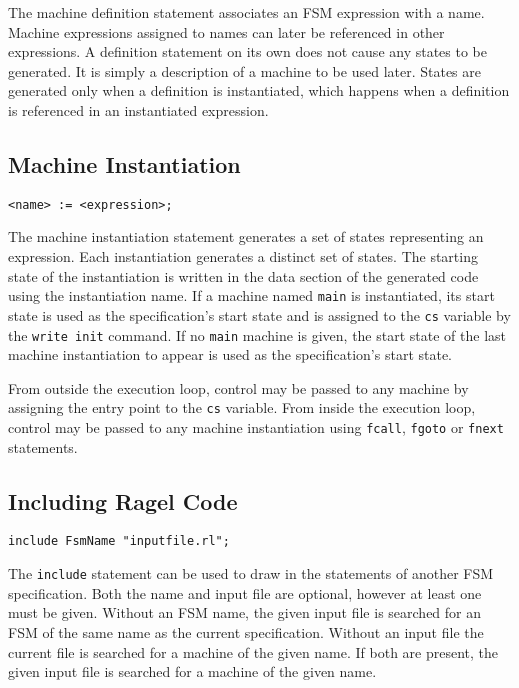 \documentclass[letterpaper,11pt,oneside]{book}
\newcommand{\verbspace}{\vspace{10pt}}
\begin{document}
The machine definition statement associates an FSM expression with a name. Machine
expressions assigned to names can later be referenced in other expressions. A
definition statement on its own does not cause any states to be generated. It is simply a
description of a machine to be used later. States are generated only when a definition is
instantiated, which happens when a definition is referenced in an instantiated
expression. 

\subsection{Machine Instantiation}
\label{instantiation}

\begin{verbatim}
<name> := <expression>;
\end{verbatim}
\verbspace

The machine instantiation statement generates a set of states representing an
expression. Each instantiation generates a distinct set of states.  The starting
state of the instantiation is written in the data section of the generated code
using the instantiation name.  If a machine named
\verb|main| is instantiated, its start state is used as the
specification's start state and is assigned to the \verb|cs| variable by the
\verb|write init| command. If no \verb|main| machine is given, the start state
of the last machine instantiation to appear is used as the specification's
start state.

From outside the execution loop, control may be passed to any machine by
assigning the entry point to the \verb|cs| variable.  From inside the execution
loop, control may be passed to any machine instantiation using \verb|fcall|,
\verb|fgoto| or \verb|fnext| statements.

\subsection{Including Ragel Code}

\begin{verbatim}
include FsmName "inputfile.rl";
\end{verbatim}
\verbspace

The \verb|include| statement can be used to draw in the statements of another FSM
specification. Both the name and input file are optional, however at least one
must be given. Without an FSM name, the given input file is searched for an FSM
of the same name as the current specification. Without an input file the
current file is searched for a machine of the given name. If both are present,
the given input file is searched for a machine of the given name.
\end{document}

